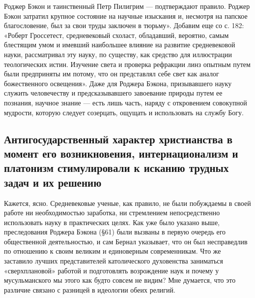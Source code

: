 Роджер Бэкон и таинственный Петр Пилигрим --- подтверждают правило.
Роджер Бэкон затратил крупное состояние на научные изыскания и,
несмотря на папское благословение, был за свои труды заключен в
тюрьму». Добавим еще со с. 182: «Роберт
Гроссетест, средневековый схоласт, обладавший, вероятно, самым
блестящим умом и имевший наибольшее влияние на развитие средневековой
науки, рассматривал эту науку, по существу, как средство для
иллюстрации теологических истин. Изучение света и проверка рефракции
линз опытным путем были предприняты им потому, что он представлял себе
свет как аналог божественного освещения». Даже для Роджера Бэкона,
призывавшего науку служить человечеству и предсказывавшего завоевание
природы путем ее познания, научное знание --- есть лишь часть, наряду
с откровением совокупной мудрости, которую следует созерцать, ощущать
и использовать на службу Богу.

\subsection{Антигосударственный характер христианства в момент его
возникновения, интернационализм и платонизм стимулировали к исканию
трудных задач и их решению}

Кажется, ясно. Средневековые ученые, как правило, не были
побуждаемы в своей работе ни необходимостью заработка, ни стремлением
непосредственно использовать науку в практических целях. Как уже было
указано выше, преследования Роджера Бэкона (§61) были вызваны в
первую очередь его общественной деятельностью, и сам Бернал указывает,
что он был несправедлив по отношению к своим великим и единоверным
современникам. Что же заставило лучших представителей католического
духовенства заниматься «сверхплановой» работой и подготовлять
возрождение наук и почему у мусульманского мы этого как будто совсем
не видим? Мне думается, что это различие связано с разницей в
идеологии обеих религий.


